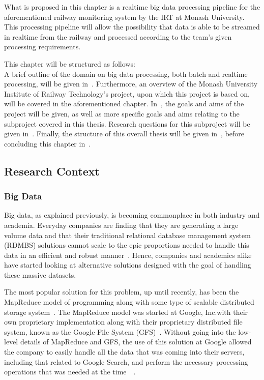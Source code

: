 What is proposed in this chapter is a realtime big data processing pipeline for the aforementioned railway monitoring
system by the IRT at Monash University. This processing pipeline will allow the possibility that data is able to be
streamed in realtime from the railway and processed according to the team's given processing requirements.

This chapter will be structured as follows:\\
A brief outline of the domain on big data processing, both batch and realtime processing, will be given
in~. Furthermore, an overview of the Monash University Institute of Railway Technology's
project, upon which this project is based on, will be covered in the aforementioned chapter. In~,
the goals and aims of the project will be given, as well as more specific goals and aims relating to the subproject
covered in this thesis. Research questions for this subproject will be given in~.
Finally, the structure of this overall thesis will be given in~, before
concluding this chapter in~.




\subsection{Research Context} %
\label{sec:research_context}

\subsubsection{Big Data} %
\label{sub:big_data}

Big data, as explained previously, is becoming commonplace in both industry and academia. Everyday companies are finding
that they are generating a large volume data and that their traditional relational database management system (RDMBS) solutions cannot
scale to the epic proportions needed to handle this data in an efficient and robust manner~\cite{marz2013principles}.
Hence, companies and academics alike have started looking at alternative solutions designed with the goal of handling
these massive datasets.

The most popular solution for this problem, up until recently, has been the MapReduce %
 model of programming along with
some type of scalable distributed storage system~\cite{bifet_mining_2013}. The MapReduce model was started at Google,
Inc.\@ with their own proprietary implementation along with their proprietary distributed file system, known as the Google
File System (GFS)~\cite{ghemawat_google_2003}. Without going into the low-level details of MapReduce and GFS, the use of this solution at Google
allowed the company to easily handle all the data that was coming into their servers, including that related to Google Search, and perform the necessary
processing operations that was needed at the time~\cite{ghemawat_google_2003}~\cite{dean_mapreduce:_2008}.

